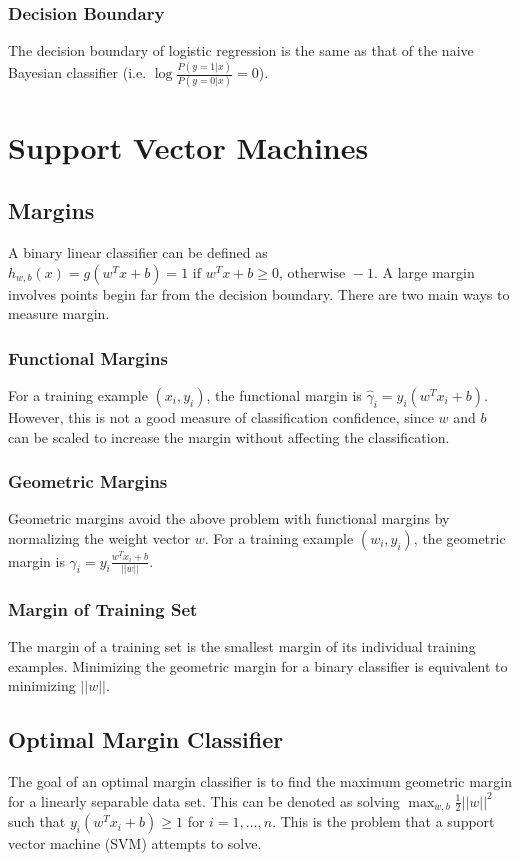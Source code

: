 \documentclass[12pt,titlepage]{article}
\let\stdsection\section
\renewcommand\section{\clearpage\stdsection}
\begin{document}
      \subsubsection{Decision Boundary}
        The decision boundary of logistic regression is the same as that of the naive Bayesian classifier (i.e. $\log{\frac{P(y=1|x)}{P(y=0|x)}} = 0$).

  \section{Support Vector Machines}

    \subsection{Margins}
      A binary linear classifier can be defined as $h_{w,b}(x) = g(w^Tx + b) = 1 \text{ if } w^Tx + b \geq 0 \text{, otherwise } -1$. A large margin
      involves points begin far from the decision boundary. There are two main ways to measure margin.

      \subsubsection{Functional Margins}
        For a training example $(x_i, y_i)$, the functional margin is $\hat{\gamma}_i = y_i(w^T x_i + b)$. However, this is not a good measure of
        classification confidence, since $w$ and $b$ can be scaled to increase the margin without affecting the classification.

      \subsubsection{Geometric Margins}
        Geometric margins avoid the above problem with functional margins by normalizing the weight vector $w$. For a training example $(w_i, y_i)$,
        the geometric margin is $\gamma_i = y_i\frac{w^T x_i + b}{||w||}$.
        
      \subsubsection{Margin of Training Set}
        The margin of a training set is the smallest margin of its individual training examples. Minimizing the geometric margin for a binary classifier
        is equivalent to minimizing $||w||$.

    \subsection{Optimal Margin Classifier}
      The goal of an optimal margin classifier is to find the maximum geometric margin for a linearly separable data set. This can be denoted as solving
      $\max_{w,b} \frac{1}{2}||w||^2$ such that $y_i(w^T x_i + b) \geq 1$ for $i = 1, \dots, n$. This is the problem that a support vector machine (SVM)
      attempts to solve.
\end{document}
